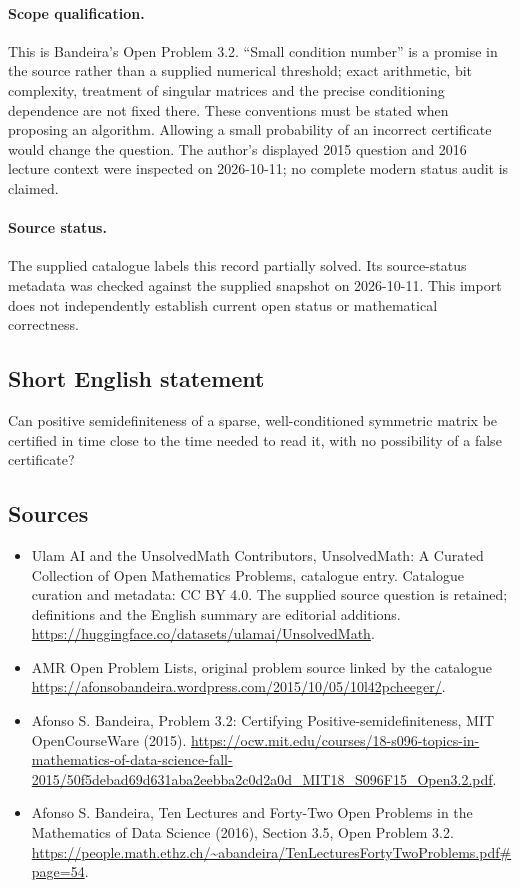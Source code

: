 \documentclass[11pt]{article}
\begin{document}
\paragraph{Scope qualification.}
This is Bandeira's Open Problem 3.2. ``Small condition number'' is a promise in the source rather than a supplied numerical threshold; exact arithmetic, bit complexity, treatment of singular matrices and the precise conditioning dependence are not fixed there. These conventions must be stated when proposing an algorithm. Allowing a small probability of an incorrect certificate would change the question. The author's displayed 2015 question and 2016 lecture context were inspected on 2026-10-11; no complete modern status audit is claimed.
\paragraph{Source status.}
The supplied catalogue labels this record partially solved. Its source-status metadata was checked against the supplied snapshot on 2026-10-11. This import does not independently establish current open status or mathematical correctness.
\subsection{Short English statement}
Can positive semidefiniteness of a sparse, well-conditioned symmetric matrix be certified in time close to the time needed to read it, with no possibility of a false certificate?
\subsection{Sources}
\begin{itemize}
\item[\hypertarget{source:statement:1}{S1}] Ulam AI and the UnsolvedMath Contributors, UnsolvedMath: A Curated Collection of Open Mathematics Problems, catalogue entry. Catalogue curation and metadata: CC BY 4.0. The supplied source question is retained; definitions and the English summary are editorial additions.
\url{https://huggingface.co/datasets/ulamai/UnsolvedMath}.
\item[\hypertarget{source:statement:2}{S2}] AMR Open Problem Lists, original problem source linked by the catalogue
\url{https://afonsobandeira.wordpress.com/2015/10/05/10l42pcheeger/}.
\item[\hypertarget{source:statement:3}{S3}] Afonso S. Bandeira, Problem 3.2: Certifying Positive-semidefiniteness, MIT OpenCourseWare (2015).
\url{https://ocw.mit.edu/courses/18-s096-topics-in-mathematics-of-data-science-fall-2015/50f5debad69d631aba2eebba2c0d2a0d_MIT18_S096F15_Open3.2.pdf}.
\item[\hypertarget{source:statement:4}{S4}] Afonso S. Bandeira, Ten Lectures and Forty-Two Open Problems in the Mathematics of Data Science (2016), Section 3.5, Open Problem 3.2.
\url{https://people.math.ethz.ch/~abandeira/TenLecturesFortyTwoProblems.pdf#page=54}.
\end{itemize}
\end{document}
